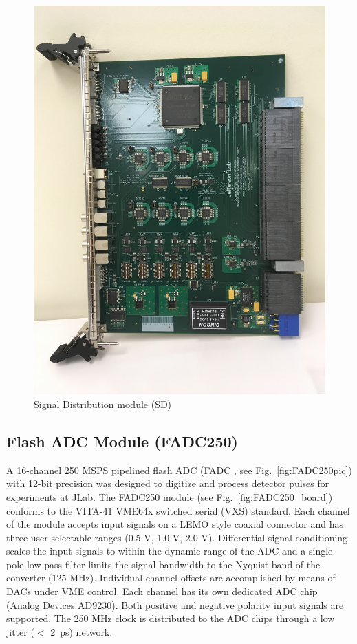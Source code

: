 \begin{figure}[hbt]
	\centering
	\includegraphics[width=1.0\columnwidth,keepaspectratio]{img/sd_board.jpg}
	\caption{Signal Distribution module (SD)}
	\label{fig:SDpic}
\end{figure}


\subsection{Flash ADC Module (FADC250)}

A 16-channel 250 MSPS pipelined flash ADC (FADC \cite{fadc-ref}, see Fig.~\ref{fig:FADC250pic}) with 12-bit precision was designed to digitize and process detector pulses for experiments at JLab.  The FADC250 module (see Fig.~\ref{fig:FADC250_board}) conforms to the VITA-41 VME64x switched serial (VXS) standard.  Each channel of the module accepts input signals on a LEMO style coaxial connector and has three user-selectable ranges (0.5 V, 1.0 V, 2.0 V).  Differential signal conditioning scales the input signals to within the dynamic range of the ADC and a single-pole low pass filter limits the signal bandwidth to the Nyquist band of the converter (125 MHz). Individual channel offsets are accomplished by means of DACs under VME control.  Each channel has its own dedicated ADC chip (Analog Devices AD9230). Both positive and negative polarity input signals are supported. The 250 MHz clock is distributed to the ADC chips through a low jitter ($<$ 2~ps) network.  

